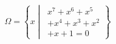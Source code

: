 \documentclass[nofonts]{ctexart}
\newcommand\Set[2]{%
	\left\{#1 \middle\vert\ #2 \right\}
}
\begin{document}
\[
	\Omega = \Set{x}{
		\begin{multlined}
			x^7+x^6+x^5	\\
			+x^4+x^3+x^2	\\
			+x+1=0
		\end{multlined}
	}
\]
\end{document}
